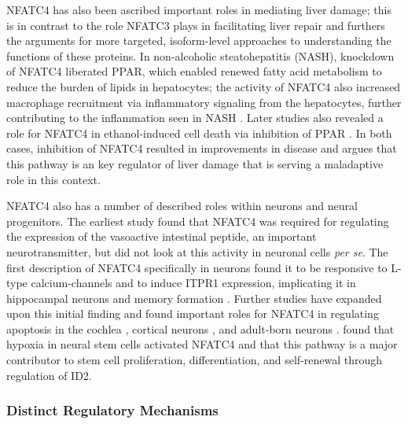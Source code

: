 NFATC4 has also been ascribed important roles in mediating liver damage; this is in contrast to the role NFATC3 plays in facilitating liver repair and furthers the arguments for more targeted, isoform-level approaches to understanding the functions of these proteins. In non-alcoholic steatohepatitis (NASH), knockdown of NFATC4 liberated PPAR\textalpha, which enabled renewed fatty acid metabolism to reduce the burden of lipids in hepatocytes; the activity of NFATC4 also increased macrophage recruitment via inflammatory signaling from the hepatocytes, further contributing to the inflammation seen in NASH \citep{Du2020}. Later studies also revealed a role for NFATC4 in ethanol-induced cell death via inhibition of PPAR\textgamma{} \citep{Wu2021}. In both cases, inhibition of NFATC4 resulted in improvements in disease and argues that this pathway is an key regulator of liver damage that is serving a maladaptive role in this context.

NFATC4 also has a number of described roles within neurons and neural progenitors. The earliest study found that NFATC4 was required for regulating the expression of the vasoactive intestinal peptide, an important neurotransmitter, but did not look at this activity in neuronal cells \textit{per se}. The first description of NFATC4 specifically in neurons found it to be responsive to L-type calcium-channels and to induce ITPR1 expression, implicating it in hippocampal neurons and memory formation \citep{Graef1999}. Further studies have expanded upon this initial finding and found important roles for NFATC4 in regulating apoptosis in the cochlea \citep{Luoma2008}, cortical neurons \citep{Vashishta2009}, and adult-born neurons \citep{Quadrato2012}. \citet{Moreno2015} found that hypoxia in neural stem cells activated NFATC4 and that this pathway is a major contributor to stem cell proliferation, differentiation, and self-renewal through regulation of ID2. 

\subsubsection{Distinct Regulatory Mechanisms}\label{nfatreg}

